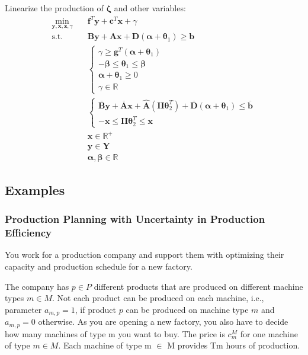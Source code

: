 \documentclass[fleqn,10pt]{wlscirep}
\begin{document}
Linearize the production of $\boldsymbol{\zeta}$ and other variables:
\begin{align}
    \min_{\mathbf{y}, \mathbf{x}, \mathbf{z}, \gamma} \quad& \mathbf{f}^{T} \mathbf{y} + \mathbf{c}^{T} \mathbf{x} + \gamma \\
    \text{s.t.} \quad & \mathbf{B} \mathbf{y} + \mathbf{A} \mathbf{x} + \mathbf{D} (\boldsymbol{\alpha} + \boldsymbol{\theta}_{1}) \geq \mathbf{b} \\ 
    & \begin{cases}
        \gamma \geq \mathbf{g}^{T} (\boldsymbol{\alpha} + \boldsymbol{\theta}_{1}) \\
        - \boldsymbol{\beta} \leq \boldsymbol{\theta}_{1} \leq \boldsymbol{\beta} \\   
        \boldsymbol{\alpha} + \boldsymbol{\theta}_{1} \geq 0 \\
        \gamma \in \mathbb{R}
    \end{cases} \\
    & \begin{cases}
        \overline{\mathbf{B}} \mathbf{y} + \overline{\mathbf{A}} \mathbf{x} + \hat{\mathbf{A}} \left(\mathbf{II} \boldsymbol{\theta}_{2}^{T} \right) + \overline{\mathbf{D}} (\boldsymbol{\alpha} + \boldsymbol{\theta}_{1}) \leq \overline{\mathbf{b}} \\
        - \mathbf{x} \leq \mathbf{II} \boldsymbol{\theta}_{2}^{T} \leq \mathbf{x}
    \end{cases} \\
    & \mathbf{x} \in \mathbb{R}^{+} \\
    & \mathbf{y} \in \mathbf{Y} \\
    & \boldsymbol{\alpha}, \boldsymbol{\beta} \in \mathbb{R}
\end{align}

\subsection{Examples}

\subsubsection{Production Planning with Uncertainty in Production Efficiency}

You work for a production company and support them with optimizing their capacity and production schedule for a new factory.

The company has $p \in P$ different products that are produced on different machine types $m \in M$. Not each product can be produced on each machine, i.e., parameter $a_{m, p} = 1$, if product $p$ can be produced on machine type $m$ and $a_{m, p} = 0$ otherwise. As you are opening a new factory, you also have to decide how many machines of type m you want to buy. The price is $c^{M}_{m}$ for one machine of type $m \in M$. Each machine of type m $\in$ M provides Tm hours of production. 
\end{document}
